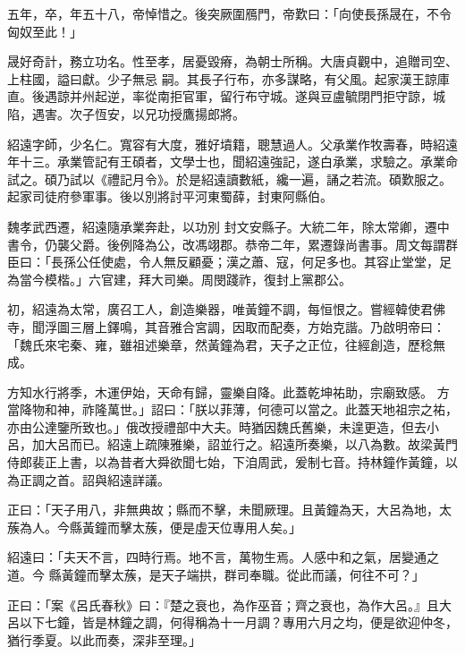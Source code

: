 \begin{pinyinscope}
 五年，卒，年五十八，帝悼惜之。後突厥圍鴈門，帝歎曰：「向使長孫晟在，不令匈奴至此！」



 晟好奇計，務立功名。性至孝，居憂毀瘠，為朝士所稱。大唐貞觀中，追贈司空、上柱國，謚曰獻。少子無忌
 嗣。其長子行布，亦多謀略，有父風。起家漢王諒庫直。後遇諒并州起逆，率從南拒官軍，留行布守城。遂與豆盧毓閉門拒守諒，城陷，遇害。次子恆安，以兄功授鷹揚郎將。



 紹遠字師，少名仁。寬容有大度，雅好墳籍，聰慧過人。父承業作牧壽春，時紹遠年十三。承業管記有王碩者，文學士也，聞紹遠強記，遂白承業，求驗之。承業命試之。碩乃試以《禮記月令》。於是紹遠讀數紙，纔一遍，誦之若流。碩歎服之。起家司徒府參軍事。後以別將討平河東蜀薛，封東阿縣伯。



 魏孝武西遷，紹遠隨承業奔赴，以功別
 封文安縣子。大統二年，除太常卿，遷中書令，仍襲父爵。後例降為公，改馮翊郡。恭帝二年，累遷錄尚書事。周文每謂群臣曰：「長孫公任使處，令人無反顧憂；漢之蕭、寇，何足多也。其容止堂堂，足為當今模楷。」六官建，拜大司樂。周閔踐祚，復封上黨郡公。



 初，紹遠為太常，廣召工人，創造樂器，唯黃鐘不調，每恒恨之。嘗經韓使君佛寺，聞浮圖三層上鐸鳴，其音雅合宮調，因取而配奏，方始克諧。乃啟明帝曰：「魏氏來宅秦、雍，雖祖述樂章，然黃鐘為君，天子之正位，往經創造，歷稔無成。



 方知水行將季，木運伊始，天命有歸，靈樂自降。此蓋乾坤祐助，宗廟致感。
 方當降物和神，祚隆萬世。」詔曰：「朕以菲薄，何德可以當之。此蓋天地祖宗之祐，亦由公達鑒所致也。」俄改授禮部中大夫。時猶因魏氏舊樂，未遑更造，但去小呂，加大呂而已。紹遠上疏陳雅樂，詔並行之。紹遠所奏樂，以八為數。故梁黃門侍郎裴正上書，以為昔者大舜欲聞七始，下洎周武，爰制七音。持林鐘作黃鐘，以為正調之首。詔與紹遠詳議。



 正曰：「天子用八，非無典故；縣而不擊，未聞厥理。且黃鐘為天，大呂為地，太蔟為人。今縣黃鐘而擊太蔟，便是虛天位專用人矣。」



 紹遠曰：「夫天不言，四時行焉。地不言，萬物生焉。人感中和之氣，居變通之道。今
 縣黃鐘而擊太蔟，是天子端拱，群司奉職。從此而議，何往不可？」



 正曰：「案《呂氏春秋》曰：『楚之衰也，為作巫音；齊之衰也，為作大呂。』且大呂以下七鐘，皆是林鐘之調，何得稱為十一月調？專用六月之均，便是欲迎仲冬，猶行季夏。以此而奏，深非至理。」




\end{pinyinscope}

